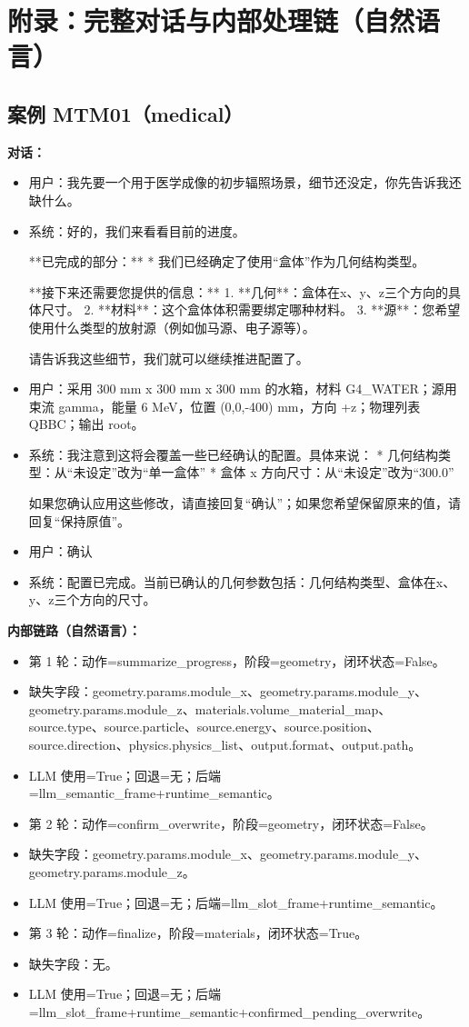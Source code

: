 \documentclass[11pt]{ctexart}
\begin{document}
\section{附录：完整对话与内部处理链（自然语言）}
\subsection{案例 MTM01（medical）}
\textbf{对话：}
\begin{itemize}
\item 用户：我先要一个用于医学成像的初步辐照场景，细节还没定，你先告诉我还缺什么。
\item 系统：好的，我们来看看目前的进度。

**已完成的部分：**
*   我们已经确定了使用“盒体”作为几何结构类型。

**接下来还需要您提供的信息：**
1.  **几何**：盒体在x、y、z三个方向的具体尺寸。
2.  **材料**：这个盒体体积需要绑定哪种材料。
3.  **源**：您希望使用什么类型的放射源（例如伽马源、电子源等）。

请告诉我这些细节，我们就可以继续推进配置了。
\item 用户：采用 300 mm x 300 mm x 300 mm 的水箱，材料 G4\_WATER；源用束流 gamma，能量 6 MeV，位置 (0,0,-400) mm，方向 +z；物理列表 QBBC；输出 root。
\item 系统：我注意到这将会覆盖一些已经确认的配置。具体来说：
*   几何结构类型：从“未设定”改为“单一盒体”
*   盒体 x 方向尺寸：从“未设定”改为“300.0”

如果您确认应用这些修改，请直接回复“确认”；如果您希望保留原来的值，请回复“保持原值”。
\item 用户：确认
\item 系统：配置已完成。当前已确认的几何参数包括：几何结构类型、盒体在x、y、z三个方向的尺寸。
\end{itemize}
\textbf{内部链路（自然语言）：}
\begin{itemize}
\item 第 1 轮：动作=summarize\_progress，阶段=geometry，闭环状态=False。
\item 缺失字段：geometry.params.module\_x、geometry.params.module\_y、geometry.params.module\_z、materials.volume\_material\_map、source.type、source.particle、source.energy、source.position、source.direction、physics.physics\_list、output.format、output.path。
\item LLM 使用=True；回退=无；后端=llm\_semantic\_frame+runtime\_semantic。
\item 第 2 轮：动作=confirm\_overwrite，阶段=geometry，闭环状态=False。
\item 缺失字段：geometry.params.module\_x、geometry.params.module\_y、geometry.params.module\_z。
\item LLM 使用=True；回退=无；后端=llm\_slot\_frame+runtime\_semantic。
\item 第 3 轮：动作=finalize，阶段=materials，闭环状态=True。
\item 缺失字段：无。
\item LLM 使用=True；回退=无；后端=llm\_slot\_frame+runtime\_semantic+confirmed\_pending\_overwrite。
\end{itemize}
\end{document}
